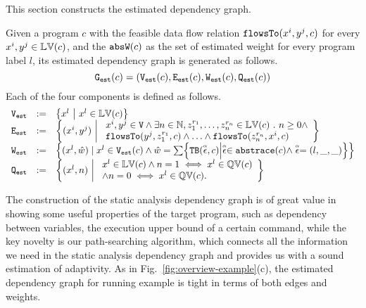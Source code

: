 This section constructs the estimated dependency graph.
\begin{defn}
\label{def:prog_graph}
Given a program $c$ 
with the feasible data flow relation $\mathtt{flowsTo}(x^i, y^j, c)$ for every $x^i, y^j \in \mathbb{LV}(c)$, 
and the $\mathtt{abs}{\mathtt{W}}(c)$ as the set of estimated weight for every program label $l$,
its estimated dependency graph
is generated as follows.
\[\mathtt{{G_{est}}}(c) = (\mathtt{{V_{est}}}(c), \mathtt{{E_{est}}}(c), \mathtt{{W_{est}}}(c), \mathtt{{Q_{est}}}(c))\]
Each of the four components is defined as follows.
{\small
\[
\begin{array}{lll}
\progV & := & \left\{ 
x^l
~ \middle\vert ~
x^l \in \lvar(c)
\right\}
\\
\progE & := & 
\left\{ 
(x^i, y^j) 
~ \middle\vert ~
\begin{array}{l}
x^i, y^j \in \vertxs
\land
\exists n \in \mathbb{N}, z_1^{r_1}, \ldots, z_n^{r_n} \in \lvar(c) \st
n \geq 0 \land
\\
\flowsto(y^j, z_1^{r_1}, c) 
\land \ldots \land \flowsto(z_n^{r_n}, x^i, c) 
\end{array}
\right\}
\\
\progW & := &
\left\{ (x^l, \hat{w}) 
\mid
x^l \in \progV(c) \land 
\hat{w} = 
\sum\left\{ \absclr(\absevent, c) \middle\vert \absevent \in \absflow(c) \land \absevent = (l, \_, \_) \right\}
\right\}
\\
\progF & := & 
\left\{(x^l, n) 
~ \middle\vert ~
\begin{array}{l}
 x^l \in \lvar(c) \land
 n = 1 \iff x^l \in \qvar(c) \\
\land n = 0 \iff x^l \in \qvar(c) .
\end{array}
\right\}
\end{array}
\] }
\end{defn}
The construction of the static analysis dependency graph is of great value in showing some useful properties of the target program,
such as dependency between variables, the execution upper bound of a certain command,
while the key novelty is our path-searching algorithm, which connects all the information we need in the static analysis dependency graph and provides us with a sound estimation of adaptivity.
As in Fig.~\ref{fig:overview-example}(c), the estimated dependency graph for
running example is tight in terms of both edges and weights.
